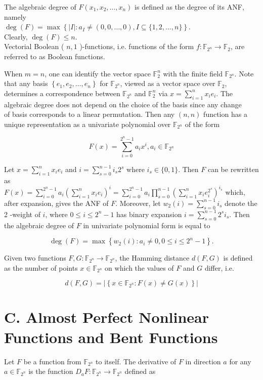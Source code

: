 \documentclass[10pt]{article}
\begin{document}
The algebraic degree of $F\left(x_{1}, x_{2}, \ldots, x_{n}\right)$ is defined as the degree of its ANF, namely\\
$\operatorname{deg}(F)=\max \left\{|I|: a_{I} \neq(0,0, \ldots, 0), I \subseteq\{1,2, \ldots, n\}\right\}$.\\
Clearly, $\operatorname{deg}(F) \leq n$.\\
Vectorial Boolean ( $n, 1$ )-functions, i.e. functions of the form $f: \mathbb{F}_{2^{n}} \rightarrow \mathbb{F}_{2}$, are referred to as Boolean functions.

When $m=n$, one can identify the vector space $\mathbb{F}_{2}^{n}$ with the finite field $\mathbb{F}_{2^{n}}$. Note that any basis $\left\{e_{1}, e_{2}, \ldots, e_{n}\right\}$ for $\mathbb{F}_{2^{n}}$, viewed as a vector space over $\mathbb{F}_{2}$, determines a correspondence between $\mathbb{F}_{2^{n}}$ and $\mathbb{F}_{2}^{n}$ via $x=\sum_{i=1}^{n} x_{i} e_{i}$. The algebraic degree does not depend on the choice of the basis since any change\\
of basis corresponds to a linear permutation. Then any $(n, n)$ function has a unique representation as a univariate polynomial over $\mathbb{F}_{2^{n}}$ of the form

$$
F(x)=\sum_{i=0}^{2^{n}-1} a_{i} x^{i}, a_{i} \in \mathbb{F}_{2^{n}}
$$

Let $x=\sum_{i=1}^{n} x_{i} e_{i}$ and $i=\sum_{s=0}^{n-1} i_{s} 2^{s}$ where $i_{s} \in\{0,1\}$. Then $F$ can be rewritten as\\
$F(x)=\sum_{i=0}^{2^{n}-1} a_{i}\left(\sum_{i=1}^{n} x_{i} e_{i}\right)^{i}=\sum_{i=0}^{2^{n}-1} a_{i} \prod_{s=0}^{n-1}\left(\sum_{i=1}^{n} x_{i} e_{i}^{2^{s}}\right)^{i_{s}}$ which, after expansion, gives the ANF of $F$. Moreover, let $w_{2}(i)=\sum_{s=0}^{n-1} i_{s}$ denote the 2 -weight of $i$, where $0 \leq i \leq 2^{n}-1$ has binary expansion $i=\sum_{s=0}^{n-1} 2^{s} i_{s}$. Then the algebraic degree of $F$ in univariate polynomial form is equal to

$$
\operatorname{deg}(F)=\max \left\{w_{2}(i): a_{i} \neq 0,0 \leq i \leq 2^{n}-1\right\} .
$$

Given two functions $F, G: \mathbb{F}_{2^{n}} \rightarrow \mathbb{F}_{2^{n}}$, the Hamming distance $d(F, G)$ is defined as the number of points $x \in \mathbb{F}_{2^{n}}$ on which the values of $F$ and $G$ differ, i.e.

$$
d(F, G)=\left|\left\{x \in \mathbb{F}_{2^{n}}: F(x) \neq G(x)\right\}\right|
$$

\section*{C. Almost Perfect Nonlinear Functions and Bent Functions}
Let $F$ be a function from $\mathbb{F}_{2^{n}}$ to itself. The derivative of $F$ in direction $a$ for any $a \in \mathbb{F}_{2^{n}}$ is the function $D_{a} F: \mathbb{F}_{2^{n}} \rightarrow \mathbb{F}_{2^{n}}$ defined as
\end{document}
